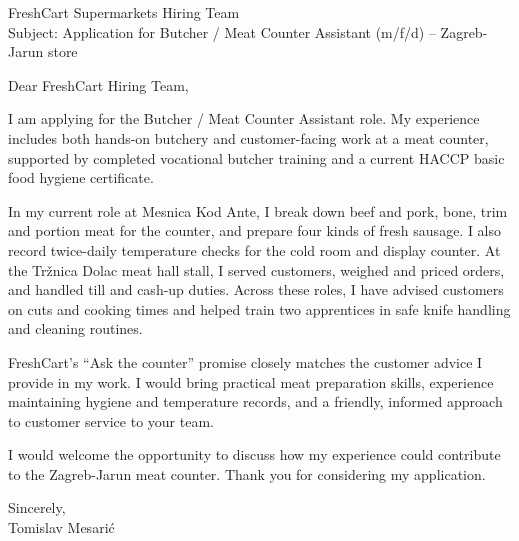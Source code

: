 \documentclass[11pt,a4paper]{article}
\begin{document}
FreshCart Supermarkets Hiring Team\\
Subject: Application for Butcher / Meat Counter Assistant (m/f/d) – Zagreb-Jarun store

Dear FreshCart Hiring Team,

I am applying for the Butcher / Meat Counter Assistant role. My experience includes both hands-on butchery and customer-facing work at a meat counter, supported by completed vocational butcher training and a current HACCP basic food hygiene certificate.

In my current role at Mesnica Kod Ante, I break down beef and pork, bone, trim and portion meat for the counter, and prepare four kinds of fresh sausage. I also record twice-daily temperature checks for the cold room and display counter. At the Tržnica Dolac meat hall stall, I served customers, weighed and priced orders, and handled till and cash-up duties. Across these roles, I have advised customers on cuts and cooking times and helped train two apprentices in safe knife handling and cleaning routines.

FreshCart's “Ask the counter” promise closely matches the customer advice I provide in my work. I would bring practical meat preparation skills, experience maintaining hygiene and temperature records, and a friendly, informed approach to customer service to your team.

I would welcome the opportunity to discuss how my experience could contribute to the Zagreb-Jarun meat counter. Thank you for considering my application.

Sincerely,\\
Tomislav Mesarić
\end{document}
